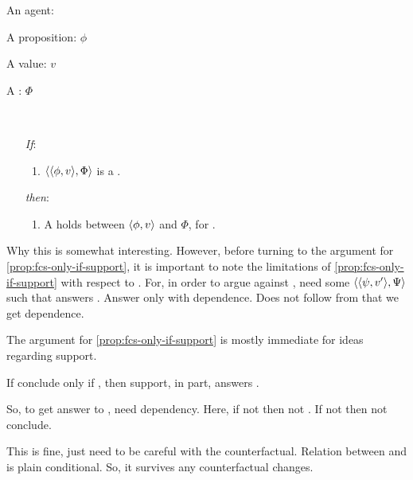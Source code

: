 \begin{note}
  \begin{proposition}
    \label{prop:fcs-only-if-support}
    \begin{itemize*}[noitemsep, label=\(\circ\)]
    \item
      An agent: \vAgent{}
    \item
      A proposition: \(\phi\)
    \item
      A value: \(v\)
    \item
      A : \(\Phi\)
    \item
      \mbox{ }
    \end{itemize*}

    \begin{enumerate}
    \item[\emph{If}:]
      \begin{enumerate}[label=\alph*., ref=(\alph*.)]
      \item
        \(\langle \langle \phi, v \rangle, \Phi \rangle\) is a .
      \end{enumerate}
    \item[\emph{then}:]
      \begin{enumerate}[label=\alph*., ref=(\alph*.), resume]
      \item
        A  holds between \(\langle \phi, v \rangle\) and \(\Phi\), for \vAgent{}.
      \end{enumerate}
    \end{enumerate}
    \vspace{-\baselineskip}
  \end{proposition}

  {
    \color{red}
    Why this is somewhat interesting.
  }
  However, before turning to the argument for \autoref{prop:fcs-only-if-support}, it is important to note the limitations of \autoref{prop:fcs-only-if-support} with respect to \issueConstraint{}.
  For, in order to argue against \issueConstraint{}, need some \(\langle \langle \psi, v' \rangle, \Psi \rangle\) such that answers \qWhyV{}.
  Answer \qWhyV{} only with dependence.
  Does not follow from  that we get dependence.
\end{note}

\begin{note}
  The argument for \autoref{prop:fcs-only-if-support} is {\color{red} mostly immediate for ideas regarding support}.

  \begin{goal}
    If conclude only if \fc{}, then support, in part, answers \qWhyV{}.
  \end{goal}

  So, to get answer to \qWhyV{}, need dependency.
  Here, if not \support{} then not \fc{}.
  If not \fc{} then not conclude.

  This is fine, just need to be careful with the counterfactual.
  Relation between \support{} and \fc{} is plain conditional.
  So, it survives any counterfactual changes.
\end{note}

